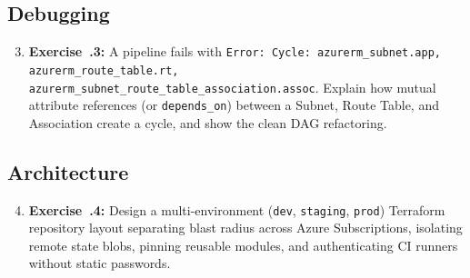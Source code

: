 \subsection{Debugging}
\begin{enumerate}[leftmargin=18pt]
  \setcounter{enumi}{2}
  \item \textbf{Exercise~\thechapter.3:} A pipeline fails with \texttt{Error: Cycle: azurerm\_subnet.app, azurerm\_route\_table.rt, azurerm\_subnet\_route\_table\_association.assoc}. Explain how mutual attribute references (or \texttt{depends\_on}) between a Subnet, Route Table, and Association create a cycle, and show the clean DAG refactoring.
\end{enumerate}

\subsection{Architecture}
\begin{enumerate}[leftmargin=18pt]
  \setcounter{enumi}{3}
  \item \textbf{Exercise~\thechapter.4:} Design a multi-environment (\texttt{dev}, \texttt{staging}, \texttt{prod}) Terraform repository layout separating blast radius across Azure Subscriptions, isolating remote state blobs, pinning reusable modules, and authenticating CI runners without static passwords.
\end{enumerate}

